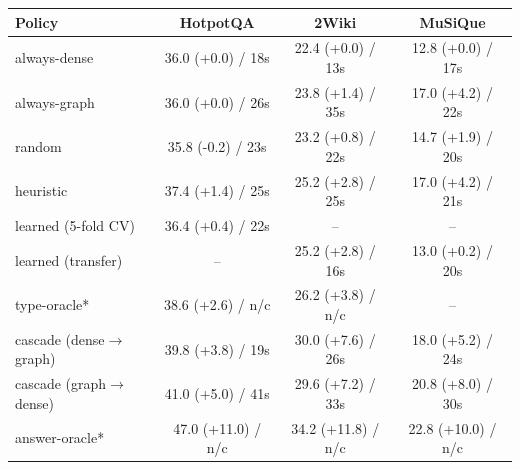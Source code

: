 \begin{tabular}{lccc}
\toprule
Policy & HotpotQA & 2Wiki & MuSiQue \\
\midrule
always-dense & 36.0 (+0.0) / 18s & 22.4 (+0.0) / 13s & 12.8 (+0.0) / 17s \\
always-graph & 36.0 (+0.0) / 26s & 23.8 (+1.4) / 35s & 17.0 (+4.2) / 22s \\
random & 35.8 (-0.2) / 23s & 23.2 (+0.8) / 22s & 14.7 (+1.9) / 20s \\
heuristic & 37.4 (+1.4) / 25s & 25.2 (+2.8) / 25s & 17.0 (+4.2) / 21s \\
learned (5-fold CV) & 36.4 (+0.4) / 22s & -- & -- \\
learned (transfer) & -- & 25.2 (+2.8) / 16s & 13.0 (+0.2) / 20s \\
type-oracle* & 38.6 (+2.6) / n/c & 26.2 (+3.8) / n/c & -- \\
cascade (dense$\rightarrow$graph) & 39.8 (+3.8) / 19s & 30.0 (+7.6) / 26s & 18.0 (+5.2) / 24s \\
cascade (graph$\rightarrow$dense) & 41.0 (+5.0) / 41s & 29.6 (+7.2) / 33s & 20.8 (+8.0) / 30s \\
answer-oracle* & 47.0 (+11.0) / n/c & 34.2 (+11.8) / n/c & 22.8 (+10.0) / n/c \\
\bottomrule
\end{tabular}